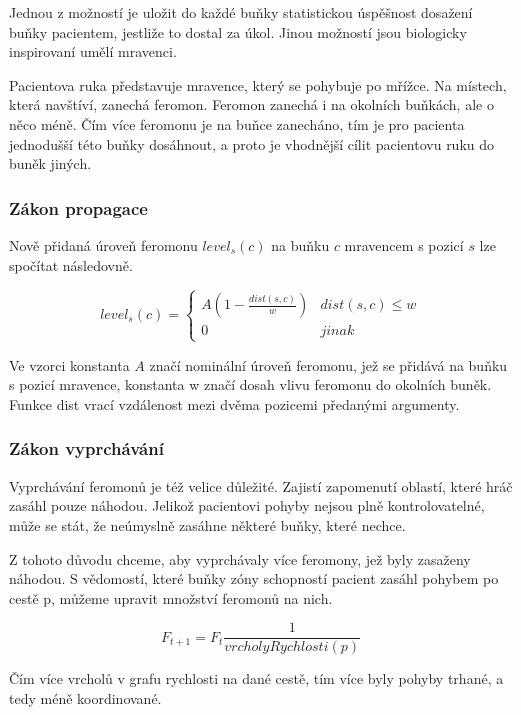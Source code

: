 Jednou z možností je uložit do každé buňky statistickou úspěšnost dosažení buňky pacientem, jestliže to dostal za úkol. Jinou možností jsou biologicky inspirovaní umělí mravenci.

Pacientova ruka představuje mravence, který se pohybuje po mřížce. Na místech, která navštíví, zanechá feromon. Feromon zanechá i na okolních buňkách, ale o něco méně. Čím více feromonu je na buňce zanecháno, tím je pro pacienta jednodušší této buňky dosáhnout, a proto je vhodnější cílit pacientovu ruku do buněk jiných.

\subsubsection{Zákon propagace}

Nově přidaná úroveň feromonu $level_s(c)$ na buňku $c$ mravencem s pozicí $s$ lze spočítat následovně.


\begin{equation}
	level_s(c)= \begin{cases}
											  A(1-\frac{dist(s, c)}{w}) & dist(s, c) \leq w \\
												0 & jinak
										 \end{cases}
\end{equation}

Ve vzorci konstanta $A$ značí nominální úroveň feromonu, jež se přidává na buňku s pozicí mravence, konstanta w značí dosah vlivu feromonu do okolních buněk. Funkce dist vrací vzdálenost mezi dvěma pozicemi předanými argumenty.

\subsubsection{Zákon vyprchávání}

Vyprchávání feromonů je též velice důležité. Zajistí zapomenutí oblastí, které hráč zasáhl pouze náhodou. Jelikož pacientovi pohyby nejsou plně kontrolovatelné, může se stát, že neúmyslně zasáhne některé buňky, které nechce.

Z tohoto důvodu chceme, aby vyprchávaly více feromony, jež byly zasaženy náhodou. S vědomostí, které buňky zóny schopností pacient zasáhl pohybem po cestě p, můžeme upravit množství feromonů na nich.

\begin{equation}
	F_{t+1} = F_t\frac{1}{vrcholyRychlosti(p)}
\end{equation}

Čím více vrcholů v grafu rychlosti na dané cestě, tím více byly pohyby trhané, a tedy méně koordinované.

